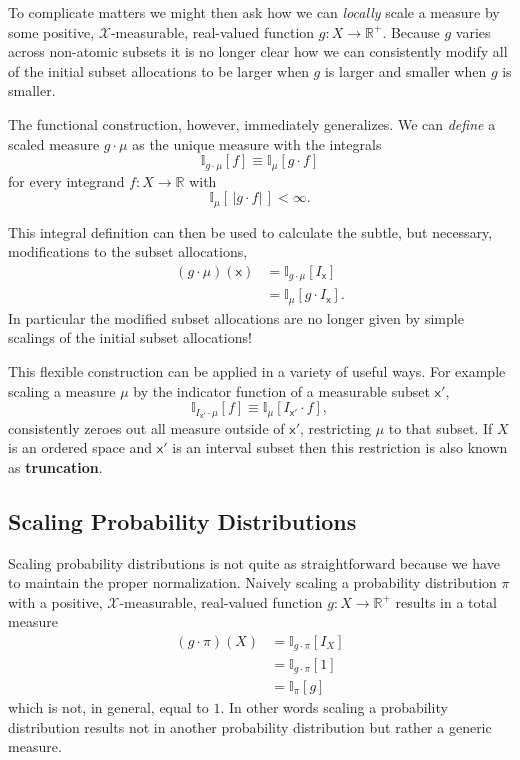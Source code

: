 \documentclass[
  letterpaper,
  DIV=11,
  numbers=noendperiod]{scrartcl}
\begin{document}
To complicate matters we might then ask how we can \emph{locally} scale
a measure by some positive, \(\mathcal{X}\)-measurable, real-valued
function \(g: X \rightarrow \mathbb{R}^{+}\). Because \(g\) varies
across non-atomic subsets it is no longer clear how we can consistently
modify all of the initial subset allocations to be larger when \(g\) is
larger and smaller when \(g\) is smaller.

The functional construction, however, immediately generalizes. We can
\emph{define} a scaled measure \(g \cdot \mu\) as the unique measure
with the integrals \[
\mathbb{I}_{g \cdot \mu} [ f ] \equiv \mathbb{I}_{\mu} [ g \cdot f ]
\] for every integrand \(f: X \rightarrow \mathbb{R}\) with \[
\mathbb{I}_{\mu} [ \, | g \cdot f | \, ] < \infty.
\]

This integral definition can then be used to calculate the subtle, but
necessary, modifications to the subset allocations, \begin{align*}
(g \cdot \mu)(\mathsf{x})
&=
\mathbb{I}_{g \cdot \mu} [ I_{\mathsf{x}} ]
\\
&=
\mathbb{I}_{\mu} [ g \cdot I_{\mathsf{x}} ].
\end{align*} In particular the modified subset allocations are no longer
given by simple scalings of the initial subset allocations!

This flexible construction can be applied in a variety of useful ways.
For example scaling a measure \(\mu\) by the indicator function of a
measurable subset \(\mathsf{x}'\), \[
\mathbb{I}_{I_{\mathsf{x}'} \cdot \mu} [ f ]
\equiv
\mathbb{I}_{\mu} [ I_{\mathsf{x}'} \cdot f ],
\] consistently zeroes out all measure outside of \(\mathsf{x}'\),
restricting \(\mu\) to that subset. If \(X\) is an ordered space and
\(\mathsf{x}'\) is an interval subset then this restriction is also
known as \textbf{truncation}.

\hypertarget{scaling-probability-distributions}{%
\subsection{Scaling Probability
Distributions}\label{scaling-probability-distributions}}

Scaling probability distributions is not quite as straightforward
because we have to maintain the proper normalization. Naively scaling a
probability distribution \(\pi\) with a positive,
\(\mathcal{X}\)-measurable, real-valued function
\(g : X \rightarrow \mathbb{R}^{+}\) results in a total measure
\begin{align*}
(g \cdot \pi)(X)
&=
\mathbb{I}_{g \cdot \pi} [ I_{X} ]
\\
&=
\mathbb{I}_{g \cdot \pi} [ 1 ]
\\
&=
\mathbb{I}_{\pi} [ g ]
\end{align*} which is not, in general, equal to \(1\). In other words
scaling a probability distribution results not in another probability
distribution but rather a generic measure.
\end{document}
